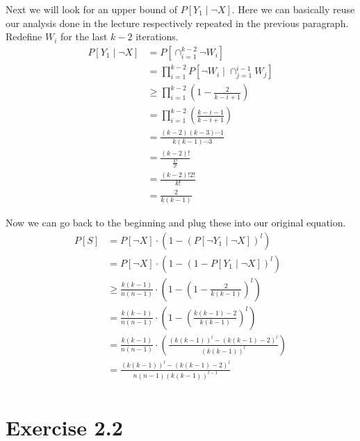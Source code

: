 \documentclass[10pt,a4paper]{article}
\begin{document}
Next we will look for an upper bound of $P\left[ Y_{1} \mid \lnot X \right]$.
Here we can basically reuse our analysis done in the lecture respectively repeated in the previous paragraph.
Redefine $W_{i}$ for the last $k - 2$ iterations.
\begin{align*}
  P\left[ Y_{1} \mid \lnot X \right] & = P\left[ \cap_{i = 1}^{k - 2} \lnot W_{i} \right]\\
                                     & = \prod_{i = 1}^{k - 2} P\left[ \lnot W_{i} \mid \cap_{j = 1}^{i - 1} W_{j} \right]\\
                                     & \ge \prod_{i = 1}^{k - 2} \left( 1 - \frac{2}{k - i + 1} \right)\\
                                     & = \prod_{i = 1}^{k - 2} \left( \frac{k - i - 1}{k - i + 1} \right)\\
                                     & = \frac{(k - 2)(k - 3) \cdots 1}{k(k - 1) \cdots 3}\\
                                     & = \frac{(k - 2)!}{\frac{k!}{2!}}\\
                                     & = \frac{(k - 2)!2!}{k!}\\
                                     & = \frac{2}{k(k - 1)}
\end{align*}

Now we can go back to the beginning and plug these into our original equation.
\begin{align*}
  P[S] & = P[\lnot X] \cdot \left( 1 - \left( P\left[ \lnot Y_{1} \mid \lnot X \right] \right)^{l} \right)\\
       & = P[\lnot X] \cdot \left( 1 - \left( 1 - P\left[ Y_{1} \mid \lnot X \right] \right)^{l} \right)\\
       & \ge \frac{k(k - 1)}{n(n - 1)} \cdot \left( 1 - \left( 1 - \frac{2}{k(k - 1)} \right)^{l} \right)\\
       & = \frac{k(k - 1)}{n(n - 1)} \cdot \left( 1 - \left( \frac{k(k - 1) - 2}{k(k - 1)} \right)^{l} \right)\\
       & = \frac{k(k - 1)}{n(n - 1)} \cdot \left( \frac{(k(k - 1))^{l} - (k(k - 1) - 2)^{l}}{(k(k - 1))^{l}} \right)\\
       & = \frac{(k(k - 1))^{l} - (k(k - 1) - 2)^{l}}{n(n - 1)(k(k - 1))^{l - 1}}\\
\end{align*}

\section*{Exercise 2.2}
\end{document}
